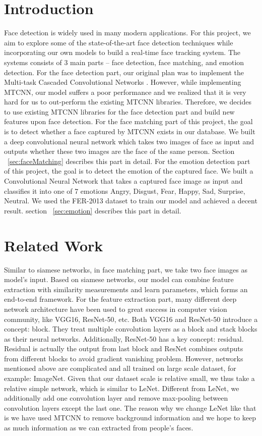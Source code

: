\documentclass[10pt,twocolumn,letterpaper]{article}
\begin{document}
\section{Introduction}
Face detection is widely used in many modern applications. For this project, we aim to explore some of the state-of-the-art face detection techniques while incorporating our own models to build a real-time face tracking system. The systems consists of 3 main parts -- face detection, face matching, and emotion detection. For the face detection part, our original plan was to implement the Multi-task Cascaded Convolutional Networks \cite{MTCNN}. However, while implementing MTCNN\cite{MTCNN}, our model suffers a poor performance and we realized that it is very hard for us to out-perform the existing MTCNN\cite{MTCNN} libraries. Therefore, we decides to use existing MTCNN libraries for the face detection part and build new features upon face detection. For the face matching part of this project, the goal is to detect whether a face captured by MTCNN\cite{MTCNN} exists in our database. We built a deep convolutional neural network which takes two images of face as input and outputs whether these two images are the face of the same person. Section ~\ref{sec:faceMatching} describes this part in detail. For the emotion detection part of this project, the goal is to detect the emotion of the captured face. We built a Convolutional Neural Network that takes a captured face image as input and classifies it into one of 7 emotions {Angry, Disgust, Fear, Happy, Sad, Surprise, Neutral}. We used the FER-2013 dataset \cite{Goodfeli-et-al-2013} to train our model and achieved a decent result. section ~\ref{sec:emotion} describes this part in detail.
\section{Related Work}

Similar to siamese networks\cite{chopra2005learning}, in face matching part, we take two face images as model's input. Based on siamese networks, our model can combine feature extraction with similarity measurements and learn parameters, which forms an end-to-end framework. For the feature extraction part, many different deep network architecture have been used to great success in computer vision community, like VGG16\cite{simonyan2014very}, ResNet-50\cite{he2016deep}, etc. Both VGG16 and ResNet-50 introduce a concept: block. They treat multiple convolution layers as a block and stack blocks as their neural networks. Additionally, ResNet-50 has a key concept: residual. Residual is actually the output from last block and ResNet combines outputs from different blocks to avoid gradient vanishing problem. However, networks mentioned above are complicated and  all trained on large scale dataset, for example: ImageNet\cite{deng2009imagenet}. Given that our dataset scale is relative small, we thus take a relative simple network, which is similar to LeNet\cite{lecun1998gradient}. Different from LeNet, we additionally add one convolution layer and remove max-pooling between convolution layers except the last one. The reason why we change LeNet like that is we have used MTCNN\cite{MTCNN} to remove background information and we hope to keep as much information as we can extracted from people's faces. 
\end{document}
